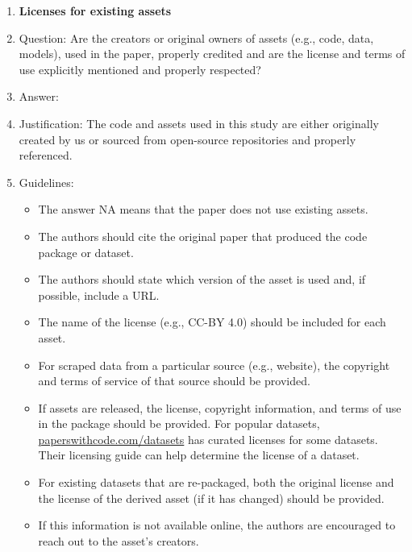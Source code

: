 \documentclass{article}
\begin{document}
\begin{enumerate}
\item {\bf Licenses for existing assets}
    \item[] Question: Are the creators or original owners of assets (e.g., code, data, models), used in the paper, properly credited and are the license and terms of use explicitly mentioned and properly respected?
    \item[] Answer: \answerYes{} %
    \item[] Justification: The code and assets used in this study are either originally created by us or sourced from open-source repositories and properly referenced.
    \item[] Guidelines:
    \begin{itemize}
        \item The answer NA means that the paper does not use existing assets.
        \item The authors should cite the original paper that produced the code package or dataset.
        \item The authors should state which version of the asset is used and, if possible, include a URL.
        \item The name of the license (e.g., CC-BY 4.0) should be included for each asset.
        \item For scraped data from a particular source (e.g., website), the copyright and terms of service of that source should be provided.
        \item If assets are released, the license, copyright information, and terms of use in the package should be provided. For popular datasets, \url{paperswithcode.com/datasets} has curated licenses for some datasets. Their licensing guide can help determine the license of a dataset.
        \item For existing datasets that are re-packaged, both the original license and the license of the derived asset (if it has changed) should be provided.
        \item If this information is not available online, the authors are encouraged to reach out to the asset's creators.
    \end{itemize}


\end{enumerate}
\end{document}
